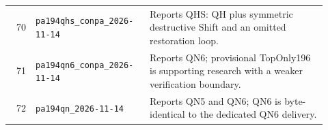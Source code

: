 {\begin{longtable}{@{}r >{\raggedright\arraybackslash}p{0.36\linewidth} >{\raggedright\arraybackslash}p{0.56\linewidth}@{}}
70 & \texttt{pa194qhs\_\allowbreak{}conpa\_\allowbreak{}2026-\allowbreak{}11-\allowbreak{}14} & Reports QHS: QH plus symmetric destructive Shift and an omitted restoration loop.\\[3pt]
71 & \texttt{pa194qn6\_\allowbreak{}conpa\_\allowbreak{}2026-\allowbreak{}11-\allowbreak{}14} & Reports QN6; provisional TopOnly196 is supporting research with a weaker verification boundary.\\[3pt]
72 & \texttt{pa194qn\_\allowbreak{}2026-\allowbreak{}11-\allowbreak{}14} & Reports QN5 and QN6; QN6 is byte-identical to the dedicated QN6 delivery.\\[3pt]
\bottomrule
\end{longtable}
}
